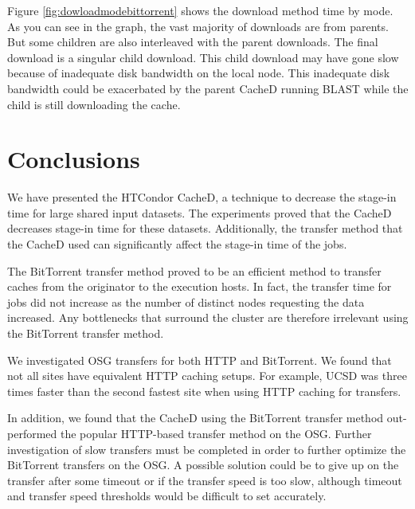 Figure \ref{fig:dowloadmodebittorrent} shows the download method time by mode.  As you can see in the graph, the vast majority of downloads are from parents.  But some children are also interleaved with the parent downloads.  The final download is a singular child download.  This child download may have gone slow because of inadequate disk bandwidth on the local node.  This inadequate disk bandwidth could be exacerbated by the parent CacheD running BLAST while the child is still downloading the cache.



\section{Conclusions}
We have presented the HTCondor CacheD, a technique to decrease the stage-in time for large shared input datasets.  The experiments proved that the CacheD decreases stage-in time for these datasets.  Additionally, the transfer method that the CacheD used can significantly affect the stage-in time of the jobs.

The BitTorrent transfer method proved to be an efficient method to transfer caches from the originator to the execution hosts.  In fact, the transfer time for jobs did not increase as the number of distinct nodes requesting the data increased.  Any bottlenecks that surround the cluster are therefore irrelevant using the BitTorrent transfer method.

We investigated OSG transfers for both HTTP and BitTorrent.  We found that not all sites have equivalent HTTP caching setups.  For example, UCSD was three times faster than the second fastest site when using HTTP caching for transfers.

In addition, we found that the CacheD using the BitTorrent transfer method out-performed the popular HTTP-based transfer method on the OSG.  Further investigation of slow transfers must be completed in order to further optimize the BitTorrent transfers on the OSG.  A possible solution could be to give up on the transfer after some timeout or if the transfer speed is too slow, although timeout and transfer speed thresholds would be difficult to set accurately.






